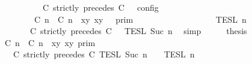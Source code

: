 \begin{isabellebody}
\ \ \ \ \ \ \ \ \ \ \ \ \ \ \ \ \ \ {\isasymturnstile}\ {\isasymPsi}\ {\isasymtriangleright}\ {\isacharparenleft}{\isacharparenleft}C\ strictly\ precedes\ C\ {\isacharhash}\ {\isasymPhi}{\isacharparenright}\ {\isasymrbrakk}\isactrlsub c\isactrlsub o\isactrlsub n\isactrlsub f\isactrlsub i\isactrlsub g\isanewline
\ \ \ \ \ \ \ \ \ \ \ \ \ \ \ \ {\isacharequal}\ {\isasymlbrakk}{\isasymlbrakk}\ {\isacharparenleft}{\isasymlceil}{\isacharhash}\isactrlsup {\isasymle}\ C\ n{\isacharcomma}\ {\isacharhash}\isactrlsup {\isacharless}\ C\ n{\isasymrceil}\ {\isasymin}\ {\isacharparenleft}{\isasymlambda}{\isacharparenleft}x{\isacharcomma}y{\isacharparenright}{\isachardot}\ x{\isasymle}y{\isacharparenright}{\isacharparenright}\ {\isacharhash}\ {\isasymGamma}\ {\isasymrbrakk}{\isasymrbrakk}\isactrlsub p\isactrlsub r\isactrlsub i\isactrlsub m\isanewline
\ \ \ \ \ \ \ \ \ \ \ \ \ \ \ \ {\isasyminter}\ {\isasymlbrakk}{\isasymlbrakk}\ {\isasymPsi}\ {\isasymrbrakk}{\isasymrbrakk}\isactrlsub T\isactrlsub E\isactrlsub S\isactrlsub L\isactrlbsup {\isasymge}\ n\isactrlesup \isanewline
\ \ \ \ \ \ \ \ \ \ \ \ \ \ \ \ {\isasyminter}\ {\isasymlbrakk}{\isasymlbrakk}\ {\isacharparenleft}C\ strictly\ precedes\ C\ {\isacharhash}\ {\isasymPhi}\ {\isasymrbrakk}{\isasymrbrakk}\isactrlsub T\isactrlsub E\isactrlsub S\isactrlsub L\isactrlbsup {\isasymge}\ Suc\ n\isactrlesup {\isacartoucheclose}\ \isamarkupfalse%
\ simp\isanewline
\ \ \isamarkupfalse%
\ \isamarkupfalse%
\ {\isacharquery}thesis\isanewline
\ \ \isamarkupfalse%
\ {\isacharminus}\isanewline
\ \ \ \ \isamarkupfalse%
\ {\isacartoucheopen}{\isasymlbrakk}\ {\isasymlceil}{\isacharhash}\isactrlsup {\isasymle}\ C\ n{\isacharcomma}\ {\isacharhash}\isactrlsup {\isacharless}\ C\ n{\isasymrceil}\ {\isasymin}\ {\isacharparenleft}{\isasymlambda}{\isacharparenleft}x{\isacharcomma}y{\isacharparenright}{\isachardot}\ x{\isasymle}y{\isacharparenright}\ {\isasymrbrakk}\isactrlsub p\isactrlsub r\isactrlsub i\isactrlsub m\isanewline
\ \ \ \ \ \ \ \ \ \ \ \ {\isasyminter}\ {\isasymlbrakk}\ C\ strictly\ precedes\ C\ {\isasymrbrakk}\isactrlsub T\isactrlsub E\isactrlsub S\isactrlsub L\isactrlbsup {\isasymge}\ Suc\ n\isactrlesup \ {\isasyminter}\ {\isasymlbrakk}{\isasymlbrakk}\ {\isasymPsi}\ {\isasymrbrakk}{\isasymrbrakk}\isactrlsub T\isactrlsub E\isactrlsub S\isactrlsub L\isactrlbsup {\isasymge}\ n\isactrlesup \isanewline

\end{isabellebody}

